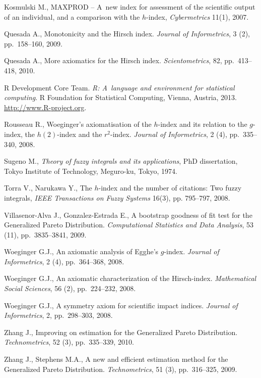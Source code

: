 \documentclass[11pt]{article}\usepackage{graphicx, color}
\newcommand{\lang}[1]{\textsf{#1}\xspace}
\newcommand{\R}{\lang{R}}
\theoremstyle{remark}
\theoremstyle{definition}
\begin{document}
\begin{thebibliography}{100}
Kosmulski M.,
MAXPROD -- A~new index for assessment of the scientific output of an individual,
and a comparison with the $h$-index, \textit{Cybermetrics} 11(1), 2007.

Quesada A.,
\newblock Monotonicity and the {H}irsch index.
\newblock \textit{Journal of Informetrics}, 3 (2), pp.~158--160, 2009.

Quesada A.,
\newblock More axiomatics for the {H}irsch index.
\newblock \textit{Scientometrics}, 82, pp.~413--418, 2010.

{\R Development Core Team}.
\newblock \textit{\R: A~language and environment for statistical
  computing}.
\newblock \R Foundation for Statistical Computing, Vienna, Austria,
  2013.
\newblock \url{http://www.R-project.org}.

Rousseau R.,
\newblock Woeginger's axiomatisation of the $h$-index and its relation to the
  $g$-index, the $h(2)$-index and the $r^2$-index.
\newblock \textit{Journal of Informetrics}, 2 (4), pp.~335--340,
  2008.

Sugeno M., \textit{Theory of fuzzy integrals and its applications},
PhD dissertation, Tokyo Institute of Technology, Meguro-ku, Tokyo, 1974.

Torra V., Narukawa Y.,
The $h$-index and the number of citations: Two fuzzy integrals,
\textit{IEEE Transactions on Fuzzy Systems} 16(3), pp. 795--797, 2008.

Villasenor-Alva J., Gonzalez-Estrada E.,
\newblock A bootstrap goodness of fit test for the {G}eneralized {P}areto
  {D}istribution.
\newblock \textit{Computational Statistics and Data Analysis}, 53
  (11), pp.~3835--3841, 2009.

Woeginger G.J.,
\newblock An axiomatic analysis of {E}gghe's $g$-index.
\newblock \textit{Journal of Informetrics}, 2 (4), pp.~364--368,
  2008.

Woeginger G.J.,
\newblock An axiomatic characterization of the {H}irsch-index.
\newblock \textit{Mathematical Social Sciences}, 56 (2), pp.~224--232,
  2008.

Woeginger G.J.,
\newblock A symmetry axiom for scientific impact indices.
\newblock \textit{Journal of Informetrics}, 2, pp.~298--303, 2008.
  
Zhang J.,
\newblock Improving on estimation for the {G}eneralized {P}areto
  {D}istribution.
\newblock \textit{Technometrics}, 52 (3), pp.~335--339, 2010.

Zhang J., Stephens M.A.,
\newblock A new and efficient estimation method for the {G}eneralized {P}areto
  {D}istribution.
\newblock \textit{Technometrics}, 51 (3), pp.~316--325, 2009.
\end{thebibliography}
\end{document}
